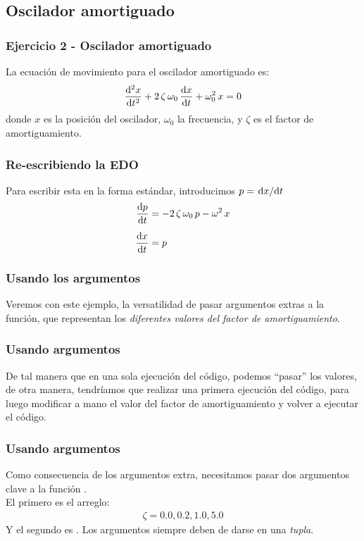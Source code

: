 \subsection{Oscilador amortiguado}
\begin{frame}
\frametitle{Ejercicio 2 - Oscilador amortiguado}
La ecuación de movimiento para el oscilador amortiguado es:
\begin{align*}
\dv[2]{x}{t} + 2 \, \zeta \,  \omega_{0} \, \dv{x}{t} + \omega_{0}^{2} \, x = 0
\end{align*}
donde $x$ es la posición del oscilador, $\omega_{0}$ la frecuencia, y $\zeta$ es el factor de amortiguamiento.
\end{frame}
\begin{frame}
\frametitle{Re-escribiendo la EDO}
Para escribir esta  en la forma estándar, introducimos $p = \dv*{x}{t}$
\begin{align*}
\dv{p}{t} &= - 2 \, \zeta \, \omega_{0} \, p - \omega^{2} \, x \\[0.5em]
\dv{x}{t} &= p
\end{align*}
\end{frame}
\begin{frame}
\frametitle{Usando los argumentos}
Veremos con este ejemplo, la versatilidad de pasar argumentos extras a la función, que representan los \emph{diferentes valores del factor de amortiguamiento}.
\end{frame}
\begin{frame}
\frametitle{Usando argumentos}
De tal manera que en una sola ejecución del código, podemos \enquote{pasar} los valores, de otra manera, tendríamos que realizar una primera ejecución del código, para luego modificar a mano el valor del factor de amortiguamiento y volver a ejecutar el código.
\end{frame}
\begin{frame}
\frametitle{Usando argumentos}
Como consecuencia de los argumentos extra, necesitamos pasar dos argumentos clave  a la función .
\\
\bigskip
El primero es el arreglo:
\begin{align*}
\zeta = 0.0, 0.2, 1.0, 5.0
\end{align*}
Y el segundo es . Los argumentos  siempre deben de darse en una \emph{tupla}.
\end{frame}
